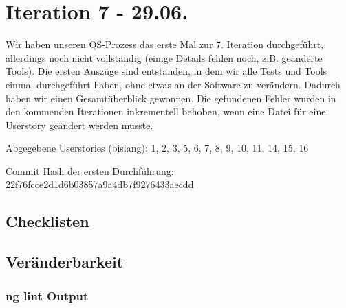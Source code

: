 \section{Iteration 7 - 29.06.}
	Wir haben unseren QS-Prozess das erste Mal zur 7. Iteration durchgeführt, allerdings noch nicht vollständig (einige Details fehlen noch, z.B. geänderte Tools). Die ersten Auszüge sind entstanden, in dem wir alle Tests und Tools einmal durchgeführt haben, ohne etwas an der Software zu verändern. Dadurch haben wir einen Gesamtüberblick gewonnen. Die gefundenen Fehler wurden in den kommenden Iterationen inkrementell behoben, wenn eine Datei für eine Userstory geändert werden musste.
	
	Abgegebene Userstories (bislang): 1, 2, 3, 5, 6, 7, 8, 9, 10, 11, 14, 15, 16
	
	Commit Hash der ersten Durchführung: 22f76fcce2d1d6b03857a9a4db7f9276433aecdd
	
	\subsection*{Checklisten}
	
	
	
	
	
	
	
	
	
	
	
	
	
	
	
	\subsection*{Veränderbarkeit}
	\subsubsection*{ng lint Output}
	

